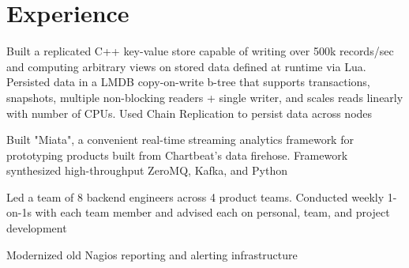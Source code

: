 \documentclass[]{deedy-resume-openfont}
\begin{document}
{}

\section{Experience}
    \begin{tightemize}
        \item
            Built a replicated C++ key-value store capable of writing over 500k
            records/sec and computing arbitrary views on stored data defined at
            runtime via Lua. Persisted data in a LMDB copy-on-write b-tree that
            supports transactions, snapshots, multiple non-blocking readers +
            single writer, and scales reads linearly with number of CPUs. Used
            Chain Replication to persist data across nodes
        \item
            Built "Miata", a convenient real-time streaming analytics framework
            for prototyping products built from Chartbeat's data firehose.
            Framework synthesized high-throughput ZeroMQ, Kafka, and Python
        \item
            Led a team of 8 backend engineers across 4 product teams. Conducted
            weekly 1-on-1s with each team member and advised each on personal,
            team, and project development
        \item
            Modernized old Nagios reporting and alerting infrastructure
    \end{tightemize}
    \vspace{5pt}
\end{document}

